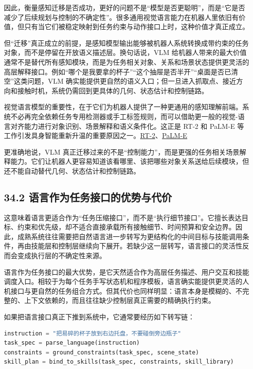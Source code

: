因此，衡量感知迁移是否成功，更好的问题不是“模型是否更聪明”，而是“它是否减少了后续规划与控制的不确定性”。很多通用视觉语言能力在机器人里依旧有价值，但只有当它们被稳定映射到任务约束与动作接口上时，这种价值才真正成立。

但“迁移”真正成立的前提，是感知模型输出能够被机器人系统转换成带约束的任务对象，而不是停留在开放语义描述层。换句话说，VLM 给机器人带来的最大价值通常不是替代所有感知模块，而是为任务相关对象、关系和场景状态提供更灵活的高层解释接口。例如“哪个是我要拿的杯子”“这个抽屉是否半开”“桌面是否已清空”这类问题，VLM 确实能提供更自然的语义入口；但一旦进入抓取点、接近方向和接触时机，系统仍需回到更具体的几何、状态估计和控制链路。

视觉语言模型的重要性，在于它们为机器人提供了一种更通用的感知理解前端。系统不必再完全依赖任务专用检测器或手工标签规则，而可以借助更一般的视觉-语言对齐能力进行对象识别、场景解释和语义条件化。这正是 RT-2 和 PaLM-E 等工作引发具身智能重新升温的重要原因之一。\href{https://arxiv.org/abs/2307.15818}{RT-2}、\href{https://arxiv.org/abs/2303.03378}{PaLM-E}

更准确地说，VLM 真正迁移过来的不是“控制能力”，而是更强的任务相关场景解释能力。它们让机器人更容易知道该看哪里、该把哪些对象关系送给后续模块，但还不能自动替代几何、状态估计和控制链路。

\subsection*{34.2 语言作为任务接口的优势与代价}


这意味着语言更适合作为“任务压缩接口”，而不是“执行细节接口”。它擅长表达目标、约束和优先级，却不适合直接承载所有接触细节、时间预算和安全边界。因此，成熟系统往往需要把自然语言进一步转写为更结构化的中间目标与技能调用条件，再由技能层和控制层继续向下展开。若缺少这一层转写，语言接口的灵活性反而会变成执行层的不确定性来源。

语言作为任务接口的最大优势，是它天然适合作为高层任务描述、用户交互和技能调度入口。相较于为每个任务手写状态机和程序模板，语言确实能提供更灵活的人机接口与更自然的任务组合方式。但其代价也同样明显：语言本身是模糊的、不完整的、上下文依赖的，而且往往缺少控制层真正需要的精确执行约束。

如果把语言接口真正下推到系统中，它通常要经历如下转写链：

\begin{lstlisting}[language=python]
instruction = "把易碎的杯子放到右边托盘，不要碰倒旁边瓶子"
task_spec = parse_language(instruction)
constraints = ground_constraints(task_spec, scene_state)
skill_plan = bind_to_skills(task_spec, constraints, skill_library)
\end{lstlisting}

